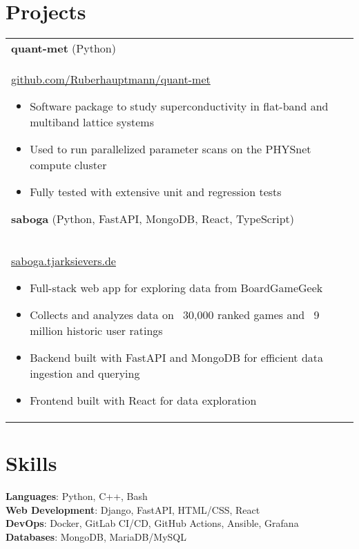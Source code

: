 \documentclass[
    fontsize=11pt,
    a4paper,
]{scrartcl}
\begin{document}
%
%

\section{Projects}
\noindent
\begin{tabularx}{\textwidth}{@{} X}
    \textbf{quant-met} (Python)     \\ \href{https://github.com/Ruberhauptmann/quant-met}{github.com/Ruberhauptmann/quant-met}          \begin{itemize}
            \item Software package to study superconductivity in flat-band and multiband lattice systems
            \item Used to run parallelized parameter scans on the PHYSnet compute cluster
            \item Fully tested with extensive unit and regression tests
        \end{itemize}
     \vspace{0.8em}
    \textbf{saboga} (Python, FastAPI, MongoDB, React, TypeScript)     \\ \href{https://saboga.tjarksievers.de}{saboga.tjarksievers.de}          \begin{itemize}
            \item Full-stack web app for exploring data from BoardGameGeek
            \item Collects and analyzes data on ~30,000 ranked games and ~9 million historic user ratings
            \item Backend built with FastAPI and MongoDB for efficient data ingestion and querying
            \item Frontend built with React for data exploration
        \end{itemize}
     \vspace{0.8em}
\end{tabularx}

%
%

\section{Skills}
\noindent
\textbf{Languages}:
Python, C++, Bash\\
\textbf{Web Development}:
Django, FastAPI, HTML/CSS, React\\
\textbf{DevOps}:
Docker, GitLab CI/CD, GitHub Actions, Ansible, Grafana\\
\textbf{Databases}:
MongoDB, MariaDB/MySQL\\
\end{document}
